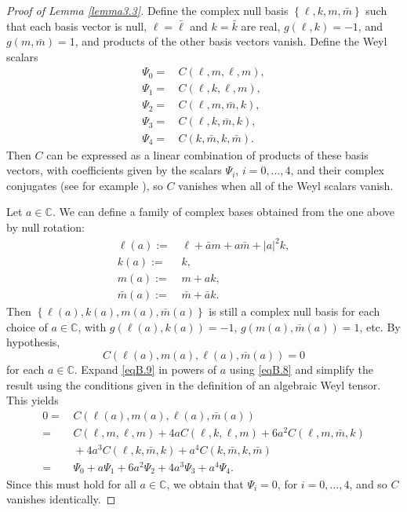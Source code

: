 \documentclass[12pt]{amsart}
\numberwithin{equation}{section}
\begin{document}
\begin{proof}[Proof of Lemma \ref{lemma3.3}]
Define the complex null basis $\left \{ \ell, k, m, {\bar m}\right \}$ such that each basis vector is null, $\ell ={\bar \ell}$ and $k={\bar k}$ are real, $g(\ell,k)=-1$, and $g(m,{\bar m})=1$, and products of the other basis vectors vanish. Define the Weyl scalars
\begin{equation}
\label{eqB.7}
\begin{split}
\Psi_0=&\, C(\ell,m,\ell,m),\\
\Psi_1=&\, C(\ell,k,\ell,m),\\
\Psi_2=&\, C(\ell,m,{\bar m},k),\\
\Psi_3=&\, C(\ell,k,{\bar m},k),\\
\Psi_4=&\, C(k,{\bar m},k,{\bar m}).
\end{split}
\end{equation}
Then $C$ can be expressed as a linear combination of products of these basis vectors, with coefficients given by the scalars $\Psi_i$, $i=0,\dots,4$, and their complex conjugates (see for example \cite[p 44, Equation (298)]{Chandra}), so $C$ vanishes when all of the Weyl scalars vanish.

Let $a\in {\mathbb C}$. We can define a family of complex bases obtained from the one above by null rotation:
\begin{equation}
\label{eqB.8}
\begin{split}
\ell(a):=&\, \ell +{\bar a} m+a{\bar m} +|a|^2 k,\\
k(a):=&\, k,\\
m(a):=&\, m+ak,\\
{\bar m}(a):=&\, {\bar m}+{\bar a}k.
\end{split}
\end{equation}
Then $\left \{ \ell(a), k(a), m(a),{\bar m}(a)\right \}$ is still a complex null basis for each choice of $a\in {\mathbb C}$, with $g(\ell(a),k(a))=-1$, $g(m(a),{\bar m}(a))=1$, etc. By hypothesis,
\begin{equation}
\label{eqB.9}
C(\ell(a),m(a),\ell(a),{\bar m}(a))=0
\end{equation}
for each $a\in {\mathbb C}$.
Expand \eqref{eqB.9} in powers of $a$ using \eqref{eqB.8} and simplify the result using the conditions given in the definition of an algebraic Weyl tensor. This yields
\begin{equation}
\label{eqB.10}
\begin{split}
0=&\, C(\ell(a),m(a),\ell(a),{\bar m}(a))\\
=&\, C(\ell,m,\ell,m) +4aC(\ell,k,\ell,m)+6a^2C(\ell,m,{\bar m},k)\\
&\, + 4a^3C(\ell,k,{\bar m},k) +a^4C(k,{\bar m},k,{\bar m})\\
=&\, \Psi_0 +a\Psi_1+6a^2\Psi_2+4a^3\Psi_3+a^4\Psi_4.
\end{split}
\end{equation}
Since this must hold for all $a\in{\mathbb C}$, we obtain that $\Psi_i=0$, for $i=0,\dots,4$, and so $C$ vanishes identically.
\end{proof}
\end{document}
